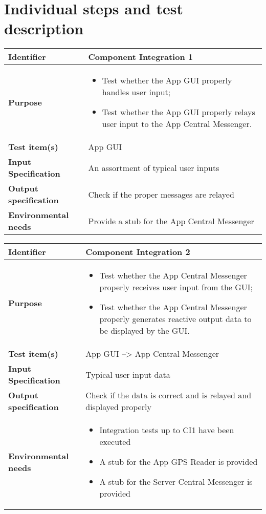\chapter{Individual steps and test description}


\begin{center}
\begin{tabular}{lp{}}
\toprule
\textbf{Identifier}		&	Component Integration 1\\
\midrule
\textbf{Purpose}		&	\begin{itemize}
					\item Test whether the App GUI properly handles user input;
					\item Test whether the App GUI properly relays user input to the App Central Messenger.
					\end{itemize}	\\
\textbf{Test item(s)}	&	App GUI\\
\textbf{Input Specification}	&	An assortment of typical user inputs\\
\textbf{Output specification}	&	Check if the proper messages are relayed\\
\textbf{Environmental needs}	&	Provide a stub for the App Central Messenger\\
\bottomrule
\end{tabular}
\end{center}


\begin{center}
\begin{tabular}{lp{}}
\toprule
\textbf{Identifier}		&	Component Integration 2\\
\midrule
\textbf{Purpose}		&	\begin{itemize}
					\item Test whether the App Central Messenger properly receives user input from the GUI;
					\item Test whether the App Central Messenger properly generates reactive output data to be displayed by the GUI.
					\end{itemize}	\\
\textbf{Test item(s)}	&	App GUI --> App Central Messenger\\
					
\textbf{Input Specification}	&	Typical user input data\\
\textbf{Output specification}	&	Check if the data is correct and is relayed and displayed properly\\
\textbf{Environmental needs}	&	\begin{itemize}
							\item Integration tests up to CI1 have been executed
							\item A stub for the App GPS Reader is provided
							\item A stub for the Server Central Messenger is provided
							\end{itemize}	\\
\bottomrule
\end{tabular}
\end{center}

